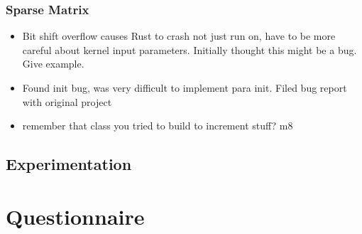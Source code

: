 \subsubsection{Sparse Matrix}
\begin{itemize}
  \item Bit shift overflow causes Rust to crash not just run on, have to be more careful about kernel input parameters. Initially thought this might be a bug. Give example.
  \item Found init bug, was very difficult to implement para init. Filed bug report with original project
  \item remember that class you tried to build to increment stuff? m8
\end{itemize}

\subsection{Experimentation}

\section{Questionnaire}
